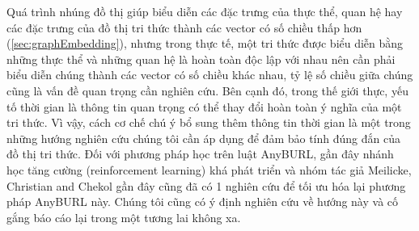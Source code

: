 Quá trình nhúng đồ thị giúp biểu diễn các đặc trưng của thực thể, quan hệ hay các đặc trưng của đồ thị tri thức thành các vector có số chiều thấp hơn (\ref{sec:graphEmbedding}), nhưng trong thực tế, một tri thức được biểu diễn bằng những thực thể và những quan hệ là hoàn toàn độc lập với nhau nên cần phải biểu diễn chúng thành các vector có số chiều khác nhau, tỷ lệ số chiều giữa chúng cũng là vấn đề quan trọng cần nghiên cứu. Bên cạnh đó, trong thế giới thực, yếu tố thời gian là thông tin quan trọng có thể thay đổi hoàn toàn ý nghĩa của một tri thức. Vì vậy, cách cơ chế chú ý bổ sung thêm thông tin thời gian là một trong những hướng nghiên cứu chúng tôi cần áp dụng để đảm bảo tính đúng đắn của đồ thị tri thức. Đối với phương pháp học trên luật AnyBURL, gần đây nhánh học tăng cường (reinforcement learning) khá phát triển và nhóm tác giả Meilicke, Christian and Chekol \cite{meilicke2020reinforced} gần đây cũng đã có 1 nghiên cứu để tối ưu hóa lại phương pháp AnyBURL này.
Chúng tôi cũng có ý định nghiên cứu về hướng này và cố gắng báo cáo lại trong một tương lai không xa.